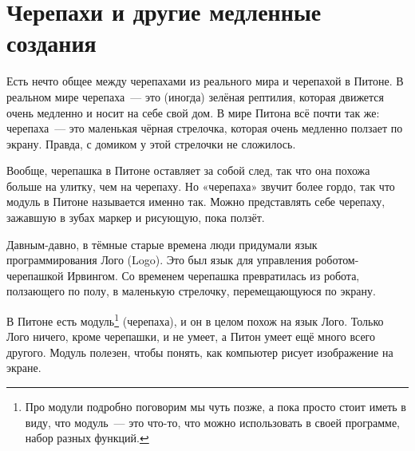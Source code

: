 %
%
%

\chapter{Черепахи и другие медленные создания}\label{ch:turtles}

Есть нечто общее между черепахами из реального мира и черепахой в Питоне. В реальном мире черепаха — это (иногда) зелёная рептилия, которая движется очень медленно и носит на себе свой дом. В мире Питона всё почти так же: черепаха — это маленькая чёрная стрелочка, которая очень медленно ползает по экрану. Правда, с домиком у этой стрелочки не сложилось.

Вообще, черепашка в Питоне оставляет за собой след, так что она похожа больше на улитку, чем на черепаху. Но «черепаха» звучит более гордо, так что модуль в Питоне называется именно так. Можно представлять себе черепаху, зажавшую в зубах маркер и рисующую, пока ползёт.

Давным-давно, в тёмные старые времена люди придумали язык программирования Лого (Logo). Это был язык для управления роботом-черепашкой Ирвингом. Со временем черепашка превратилась из робота, ползающего по полу, в маленькую стрелочку, перемещающуюся по экрану.


В Питоне есть модуль\footnote{Про модули подробно поговорим мы чуть позже, а пока просто стоит иметь в виду, что модуль — это что-то, что можно использовать в своей программе, набор разных функций.}  (черепаха), и он в целом похож на язык Лого. Только Лого ничего, кроме черепашки, и не умеет, а Питон умеет ещё много всего другого. Модуль  полезен, чтобы понять, как компьютер рисует изображение на экране.

